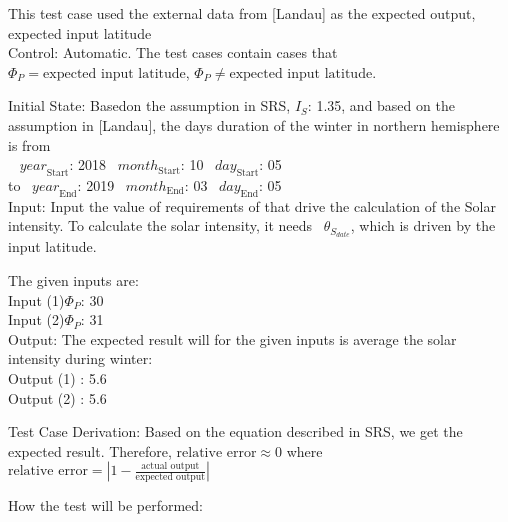 \documentclass[12pt, titlepage]{article}
\begin{document}
\begin{enumerate}
This test case used the external data from [Landau]\cite{Charles2001}   as the expected output, expected input latitude\\

Control: Automatic. The test cases contain cases that $\Phi_P = \text{expected
input latitude}$, $\Phi_P \ne \text{expected input latitude}$. 

Initial State:
Basedon the assumption in SRS\cite{YS2019}, $I_{S}$: 1.35, and based on the
assumption in [Landau]\cite{Charles2001}, the days duration of the winter in
northern hemisphere is from\\
~ $\mathit{year}_\text{Start}$: 2018
~$\mathit{month}_\text{Start}$: 10 
~$\mathit{day}_\text{Start}$: 05 \\
 to
~$\mathit{year}_\text{End}$: 2019 
~$\mathit{month}_\text{End}$: 03
~$\mathit{day}_\text{End}$: 05\\

Input: Input the value of requirements of
\progname that drive the calculation of the Solar intensity. To calculate the
solar intensity, it needs ~$\theta_{S_{date}}$, which is driven by the input
latitude.

The given inputs are:\\ 
Input (1)$\Phi_P$: 30 \\ 
Input (2)$\Phi_P$: 31\\

Output: The expected result will for the given inputs is average the solar
intensity during winter:\\ 
Output (1) : 5.6\\ 
Output (2) : 5.6\\



Test Case Derivation: Based on the equation described in SRS\cite{YS2019}, we
get the expected result. Therefore, $\text{relative error} \approx 0$ where
$\text{relative error} = | 1 - \frac{\text{actual output}}{ \text{expected
output}} |$ 


How the test will be performed: 


\end{enumerate}
\end{document}
